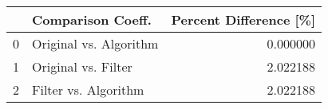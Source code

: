 \begin{tabular}{llr}
\toprule
{} &       Comparison Coeff. &  Percent Difference [\%] \\
\midrule
0 &  Original vs. Algorithm &                0.000000 \\
1 &     Original vs. Filter &                2.022188 \\
2 &    Filter vs. Algorithm &                2.022188 \\
\bottomrule
\end{tabular}
